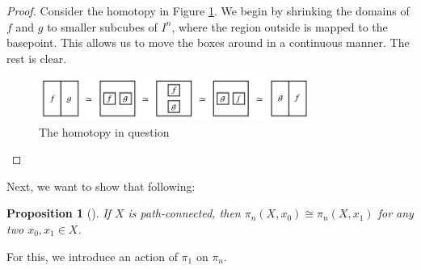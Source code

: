 \documentclass[reqno]{amsart}
\newtheorem{proposition}[theorem]{Proposition}
\theoremstyle{definition}
\theoremstyle{remark}
\begin{document}
  \begin{proof}
      Consider the homotopy in Figure \ref{fig:JIDWOOL0290L-png}.
      We begin by shrinking the domains of $f$ and $g$ to smaller
      subcubes of $I^{n}$, where the region outside is
      mapped to the basepoint. This allows us to move the boxes
      around in a continuous manner. The rest is clear.
      \begin{figure}[htpb]
          \centering
          \includegraphics[width=0.8\textwidth]{JIDWOOL0290L.png}
          \caption{The homotopy in question}
          \label{fig:JIDWOOL0290L-png}
      \end{figure}
  \end{proof}

  Next, we want to show that following:
  \begin{proposition}[]\label{Prop:SwjiaKKDNW1102}
      If $X$ is path-connected, then
      $\pi_n\left( X, x_0 \right) \cong
      \pi_n (X, x_1)$ for any two $x_0,x_1 \in X$.
  \end{proposition}

  For this, we introduce an action of
  $\pi_1$ on $\pi_n$.
\end{document}
